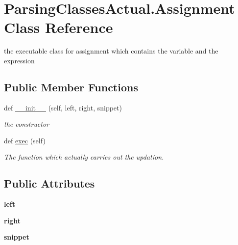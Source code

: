 \hypertarget{class_parsing_classes_actual_1_1_assignment}{}\section{Parsing\+Classes\+Actual.\+Assignment Class Reference}
\label{class_parsing_classes_actual_1_1_assignment}


the executable class for assignment which contains the variable and the expression  


\subsection*{Public Member Functions}
\begin{DoxyCompactItemize}
\item 
def \hyperlink{class_parsing_classes_actual_1_1_assignment_ad1ed51f09df9ee3ca193e0a5f6646c11}{\+\_\+\+\_\+init\+\_\+\+\_\+} (self, left, right, snippet)
\begin{DoxyCompactList}\small\item\em the constructor \end{DoxyCompactList}\item 
def \hyperlink{class_parsing_classes_actual_1_1_assignment_ad9d41c2aca94f42213fed890eb33aa44}{exec} (self)\hypertarget{class_parsing_classes_actual_1_1_assignment_ad9d41c2aca94f42213fed890eb33aa44}{}\label{class_parsing_classes_actual_1_1_assignment_ad9d41c2aca94f42213fed890eb33aa44}

\begin{DoxyCompactList}\small\item\em The function which actually carries out the updation. \end{DoxyCompactList}\end{DoxyCompactItemize}
\subsection*{Public Attributes}
\begin{DoxyCompactItemize}
\item 
{\bfseries left}\hypertarget{class_parsing_classes_actual_1_1_assignment_ae9e7a7861ee3c433563e3ffb84e96136}{}\label{class_parsing_classes_actual_1_1_assignment_ae9e7a7861ee3c433563e3ffb84e96136}

\item 
{\bfseries right}\hypertarget{class_parsing_classes_actual_1_1_assignment_a47a5c7ff174dac880264b4bcac0cdb4c}{}\label{class_parsing_classes_actual_1_1_assignment_a47a5c7ff174dac880264b4bcac0cdb4c}

\item 
{\bfseries snippet}\hypertarget{class_parsing_classes_actual_1_1_assignment_aafc31dddf6dfff65459ef199c7c6b829}{}\label{class_parsing_classes_actual_1_1_assignment_aafc31dddf6dfff65459ef199c7c6b829}

\end{DoxyCompactItemize}


